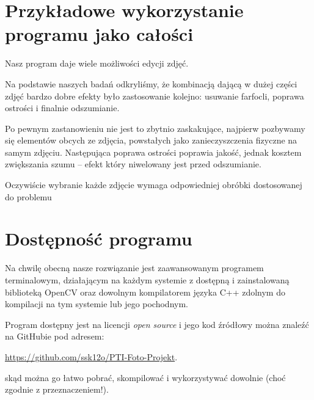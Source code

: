 \documentclass[]{mwart}
\begin{document}
\section{Przykładowe wykorzystanie programu jako całości}
Nasz program daje wiele możliwości edycji zdjęć.

Na podstawie naszych badań odkryliśmy,
że kombinacją dającą w dużej części zdjęć bardzo dobre efekty
było zastosowanie kolejno:
usuwanie farfocli, poprawa ostrości i finalnie odszumianie.

Po pewnym zastanowieniu nie jest to zbytnio zaskakujące, najpierw pozbywamy
się elementów obcych ze zdjęcia, powstałych jako zanieczyszczenia fizyczne
na samym zdjęciu. Następująca poprawa ostrości poprawia jakość, jednak kosztem
zwiększania szumu -- efekt który niwelowany jest przed odszumianie.

Oczywiście wybranie każde zdjęcie wymaga odpowiedniej obróbki dostosowanej
do problemu




\section{Dostępność programu}
Na chwilę obecną nasze rozwiązanie jest zaawansowanym programem terminalowym,
działającym na każdym systemie z dostępną i zainstalowaną biblioteką OpenCV oraz
dowolnym kompilatorem języka C++ zdolnym do kompilacji na tym systemie lub jego pochodnym.

Program dostępny jest na licencji \textit{open source} i jego kod źródłowy można znaleźć na GitHubie
pod adresem:
\begin{center}
    \url{https://github.com/ssk12o/PTI-Foto-Projekt}.
\end{center}
skąd można go łatwo pobrać, skompilować i wykorzystywać dowolnie (choć zgodnie z przeznaczeniem!).




\newpage
\end{document}
